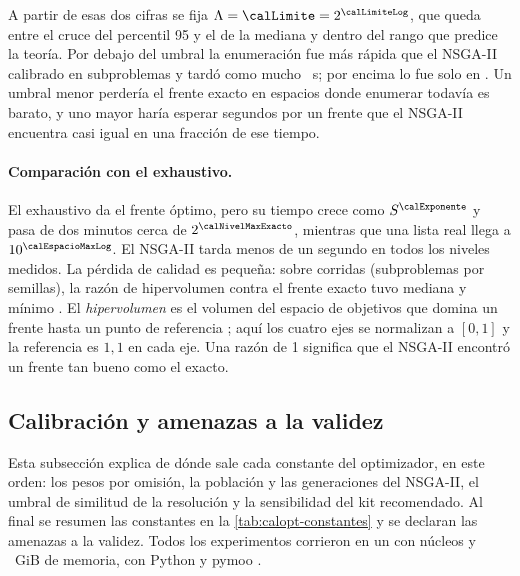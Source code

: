 A partir de esas dos cifras se fija $\Lambda=\calLimite=2^{\calLimiteLog}$,
que queda entre el cruce del percentil 95 y el de la mediana y dentro del rango
que predice la teoría. Por debajo del umbral la enumeración fue más rápida que
el NSGA-II calibrado en \calExactoGanaBajoElegida{} subproblemas y tardó como
mucho \calExactoMaxBajo~s; por encima lo fue solo en
\calExactoGanaSobreElegida. Un umbral menor perdería el frente exacto en
espacios donde enumerar todavía es barato, y uno mayor haría esperar segundos
por un frente que el NSGA-II encuentra casi igual en una fracción de ese
tiempo.

\paragraph{Comparación con el exhaustivo.} El exhaustivo da el frente óptimo,
pero su tiempo crece como $S^{\calExponente}$ y pasa de dos minutos cerca de
$2^{\calNivelMaxExacto}$, mientras que una lista real llega a
$10^{\calEspacioMaxLog}$. El NSGA-II tarda menos de un segundo en todos los
niveles medidos. La pérdida de calidad es pequeña: sobre
\calCorridasHV{} corridas (subproblemas por semillas), la razón de hipervolumen
contra el frente exacto tuvo mediana \calRazonHVMediana{} y mínimo
\calRazonHVMin. El \emph{hipervolumen} es el volumen del espacio de objetivos
que domina un frente hasta un punto de referencia \cite{zitzler_multiobjective_1999};
aquí los cuatro ejes se normalizan a $[0,1]$ y la referencia es $1{,}1$ en cada
eje. Una razón de 1 significa que el NSGA-II encontró un frente tan bueno como
el exacto.

\subsection{Calibración y amenazas a la validez}
\label{sec:calopt-calibracion}

Esta subsección explica de dónde sale cada constante del optimizador, en este
orden: los pesos por omisión, la población y las generaciones del NSGA-II, el
umbral de similitud de la resolución y la sensibilidad del kit recomendado. Al
final se resumen las constantes en la \cref{tab:calopt-constantes} y se
declaran las amenazas a la validez. Todos los experimentos corrieron en un
\calCPU{} con \calNucleos{} núcleos y \calRAM~GiB de memoria, con Python
\calPython{} y pymoo \calPymoo.

